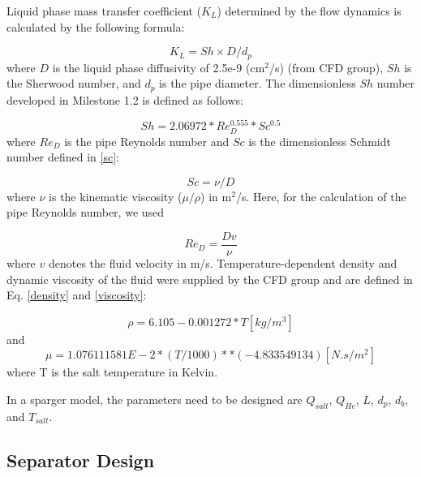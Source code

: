     Liquid phase mass transfer coefficient ($K_L$) determined by the flow 
    dynamics is calculated by the following formula:

    \begin{equation}\label{kl}
        K_L = Sh \times D / d_p
    \end{equation}
    where $D$ is the liquid phase diffusivity of 2.5e-9 (cm$^2$/s) (from CFD 
    group), $Sh$ is the Sherwood number, and $d_p$ is the pipe diameter. The 
    dimensionless $Sh$ number developed in Milestone 1.2 is defined as follows:

    \begin{equation}\label{sh}
        Sh = 2.06972 * Re_D^{0.555} * Sc^{0.5}
    \end{equation}
    where $Re_D$ is the pipe Reynolds number and $Sc$ is the dimensionless 
    Schmidt number defined in \ref{sc}:

    \begin{equation}\label{sc}
        Sc = \nu/D
    \end{equation}
    where $\nu$ is the kinematic viscosity ($\mu/\rho$) in m$^2$/s. Here, for 
    the calculation of the pipe Reynolds number, we used

    \begin{equation}\label{reynold}
        Re_D = \frac{Dv}{\nu}
    \end{equation}
    where $v$ denotes the fluid velocity in m/s. Temperature-dependent density 
    and dynamic viscosity of the fluid were supplied by the CFD group and are 
    defined in Eq. \ref{density} and \ref{viscosity}:

    \begin{equation}\label{density}
        \rho = 6.105 - 0.001272 * T [kg/m^3]
    \end{equation}
    and
    \begin{equation}\label{viscosity}
        \mu = 1.076111581E-2 * (T / 1000)**(-4.833549134) [N.s/m^2]
    \end{equation}
    where T is the salt temperature in Kelvin.

    In a sparger model, the parameters need to be designed are $Q_{salt}$, 
    $Q_{He}$, $L$, $d_p$, $d_b$, and $T_{salt}$.

\FloatBarrier

\subsection{Separator Design}

